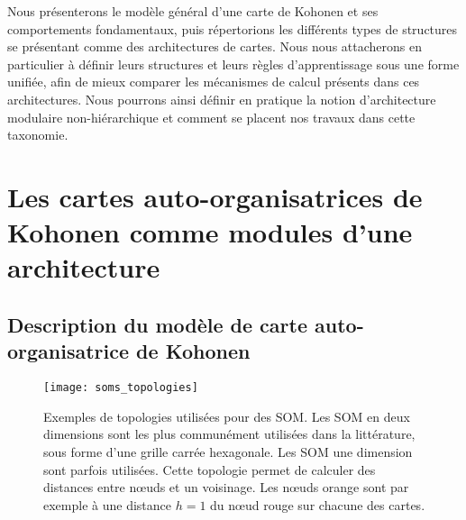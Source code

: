 \documentclass[../main]{subfiles}
\begin{document}
Nous présenterons le modèle général d'une carte de Kohonen et ses comportements fondamentaux, puis répertorions les différents types de structures se présentant comme des architectures de cartes. 
Nous nous attacherons en particulier à définir leurs structures et leurs règles d'apprentissage sous une forme unifiée, afin de mieux comparer les mécanismes de calcul présents dans ces architectures.
Nous pourrons ainsi définir en pratique la notion d'architecture modulaire non-hiérarchique et comment se placent nos travaux dans cette taxonomie.

\section{Les cartes auto-organisatrices de Kohonen comme modules d'une architecture}\label{sec:som001}

\subsection{Description du modèle de carte auto-organisatrice de Kohonen}\label{sec:modele_som}

\begin{figure}
    \centering
    \texttt{[image: soms\_topologies]}
    \caption{Exemples de topologies utilisées pour des SOM. 
    Les SOM en deux dimensions sont les plus communément utilisées dans la littérature, sous forme d'une grille carrée hexagonale. Les SOM une dimension sont parfois utilisées. Cette topologie permet de calculer des distances entre n\oe{}uds et un voisinage. Les n\oe{}uds orange sont par exemple à une distance $h = 1$ du n\oe{}ud rouge sur chacune des cartes.
    \label{fig:topo}}
    \end{figure}
\end{document}
